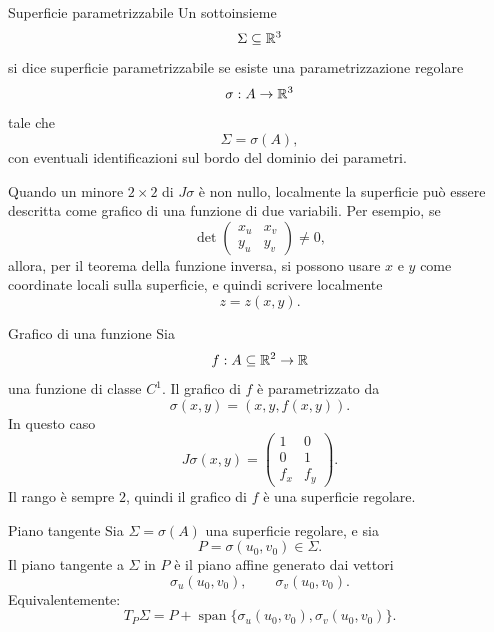 \documentclass[a4paper]{article}
\begin{document}
\begin{snippetdefinition}{Superficie parametrizzabile}
    Un sottoinsieme
    \[
        \Sigma\subseteq\mathbb{R}^3
    \]
    si dice superficie parametrizzabile se esiste una parametrizzazione regolare
    \[
        \sigma:A\to\mathbb{R}^3
    \]
    tale che
    \[
        \Sigma=\sigma(A),
    \]
    con eventuali identificazioni sul bordo del dominio dei parametri.
\end{snippetdefinition}

Quando un minore \(2\times 2\) di \(J\sigma\) è non nullo, localmente la superficie può essere descritta come grafico di una funzione di due variabili. Per esempio, se
\[
    \det
    \begin{pmatrix}
        x_u & x_v\\
        y_u & y_v
    \end{pmatrix}
    \neq 0,
\]
allora, per il teorema della funzione inversa, si possono usare \(x\) e \(y\) come coordinate locali sulla superficie, e quindi scrivere localmente
\[
    z=z(x,y).
\]

\begin{snippetexample}{Grafico di una funzione}
    Sia
    \[
        f:A\subseteq\mathbb{R}^2\to\mathbb{R}
    \]
    una funzione di classe \(C^1\). Il grafico di \(f\) è parametrizzato da
    \[
        \sigma(x,y)=
        \left(
            x,y,f(x,y)
        \right).
    \]
    In questo caso
    \[
        J\sigma(x,y)
        =
        \begin{pmatrix}
            1 & 0\\
            0 & 1\\
            f_x & f_y
        \end{pmatrix}.
    \]
    Il rango è sempre \(2\), quindi il grafico di \(f\) è una superficie regolare.
\end{snippetexample}

\begin{snippetdefinition}{Piano tangente}
    Sia \(\Sigma=\sigma(A)\) una superficie regolare, e sia
    \[
        P=\sigma(u_0,v_0)\in\Sigma.
    \]
    Il piano tangente a \(\Sigma\) in \(P\) è il piano affine generato dai vettori
    \[
        \sigma_u(u_0,v_0),
        \qquad
        \sigma_v(u_0,v_0).
    \]
    Equivalentemente:
    \[
        T_P\Sigma
        =
        P+
        \operatorname{span}
        \{
            \sigma_u(u_0,v_0),
            \sigma_v(u_0,v_0)
        \}.
    \]
\end{snippetdefinition}
\end{document}
